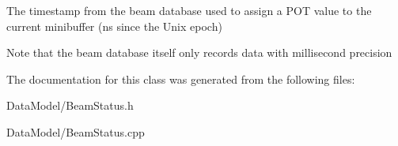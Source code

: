 The timestamp from the beam database used to assign a P\-O\-T value to the current minibuffer (ns since the Unix epoch) 

Note that the beam database itself only records data with millisecond precision 

The documentation for this class was generated from the following files\-:\begin{DoxyCompactItemize}
\item 
Data\-Model/Beam\-Status.\-h\item 
Data\-Model/Beam\-Status.\-cpp\end{DoxyCompactItemize}
